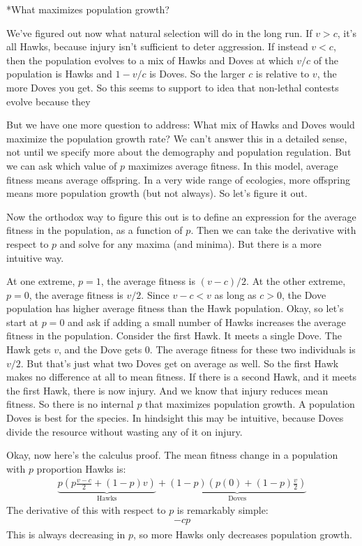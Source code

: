 \documentclass[10pt,reqno]{amsbook}
\makeatletter
\renewcommand\subsection{\@startsection{subsection}{2}
\z@{.5\linespacing\@plus.7\linespacing}{-.5em}%
{\normalfont\normalsize\bfseries}}
\numberwithin{equation}{chapter}
\makeatother
\begin{document}
\subsection*{What maximizes population growth?}

We've figured out now what natural selection will do in the long run. If $v>c$, it's all Hawks, because injury isn't sufficient to deter aggression. If instead $v<c$, then the population evolves to a mix of Hawks and Doves at which $v/c$ of the population is Hawks and $1-v/c$ is Doves. So the larger $c$ is relative to $v$, the more Doves you get. So this seems to support to idea that non-lethal contests evolve because they 

But we have one more question to address: What mix of Hawks and Doves would maximize the population growth rate? We can't answer this in a detailed sense, not until we specify more about the demography and population regulation. But we can ask which value of $p$ maximizes average fitness. In this model, average fitness means average offspring. In a very wide range of ecologies, more offspring means more population growth (but not always). So let's figure it out.

Now the orthodox way to figure this out is to define an expression for the average fitness in the population, as a function of $p$. Then we can take the derivative with respect to $p$ and solve for any maxima (and minima). But there is a more intuitive way.

At one extreme, $p=1$, the average fitness is $(v-c)/2$. At the other extreme, $p=0$, the average fitness is $v/2$. Since $v-c < v$ as long as $c>0$, the Dove population has higher average fitness than the Hawk population. Okay, so let's start at $p=0$ and ask if adding a small number of Hawks increases the average fitness in the population. Consider the first Hawk. It meets a single Dove. The Hawk gets $v$, and the Dove gets $0$. The average fitness for these two individuals is $v/2$. But that's just what two Doves get on average as well. So the first Hawk makes no difference at all to mean fitness. If there is a second Hawk, and it meets the first Hawk, there is now injury. And we know that injury reduces mean fitness. So there is no internal $p$ that maximizes population growth. A population Doves is best for the species. In hindsight this may be intuitive, because Doves divide the resource without wasting any of it on injury.

Okay, now here's the calculus proof. The mean fitness change in a population with $p$ proportion Hawks is:
\begin{align*}
	\underbrace{ p \left( p \frac{v-c}{2} + (1-p)v \right) }_{\text{Hawks}} + \underbrace{ (1-p) \left( p(0) + (1-p)\frac{v}{2} \right) }_{\text{Doves}}
\end{align*}
The derivative of this with respect to $p$ is remarkably simple:
\begin{align*}
	-cp
\end{align*}
This is always decreasing in $p$, so more Hawks only decreases population growth.
\end{document}
